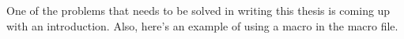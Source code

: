 
One of the problems that needs to be solved in writing this thesis is coming up with an introduction. Also, here's an example of using a macro  in the macro file.